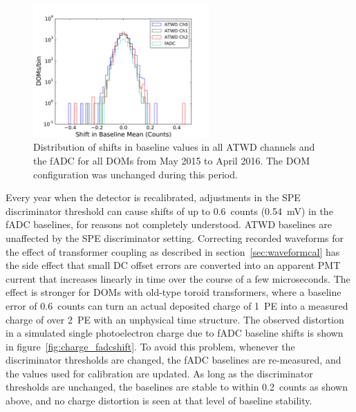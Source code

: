 \begin{figure}[!h]
 \centering
 \includegraphics[width=0.6\textwidth]{graphics/dom/reliability/baseline_stability_2015.pdf}
 \caption{Distribution of shifts in baseline values in all ATWD
   channels and the fADC for all DOMs from May 2015 to April
   2016. The DOM configuration was unchanged during this period.}
 \label{fig:baseline_stability_2015}
\end{figure}

Every year when the detector
is recalibrated, adjustments in the SPE discriminator threshold can
cause shifts of up to 0.6~counts (0.54~mV) in the fADC
baselines, for reasons not completely understood. ATWD baselines are
unaffected by the SPE discriminator 
setting. Correcting recorded waveforms for the effect of transformer
coupling as described in section~\ref{sec:waveformcal} has
the side effect that small DC offset errors are converted into an
apparent PMT current that increases linearly in time over the course
of a few microseconds. The effect is stronger for DOMs with old-type toroid
transformers, where a baseline error of 0.6~counts can 
turn an actual deposited charge of 1~PE into a measured charge of over
2~PE with an unphysical time structure. The observed distortion in a
simulated single photoelectron charge due to fADC baseline shifts is
shown in figure~\ref{fig:charge_fadcshift}.  To avoid this problem, whenever the
discriminator thresholds are changed, the fADC baselines are re-measured,
and the values used for calibration are updated. As long as 
the discriminator thresholds are unchanged, the baselines are stable
to within 0.2~counts
as shown above, and no charge distortion is seen at that level of
baseline stability.

